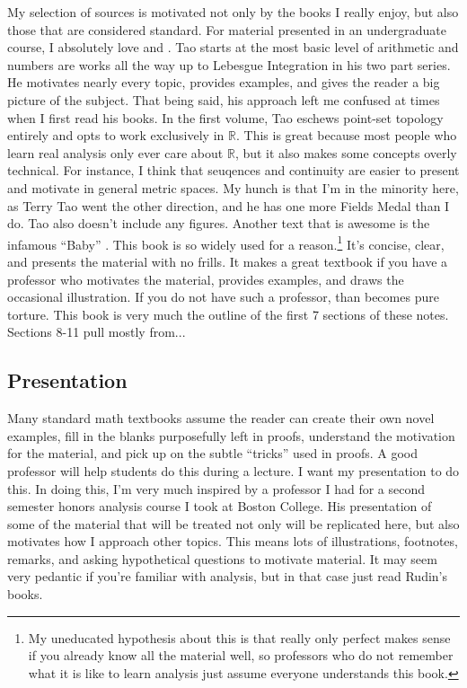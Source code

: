 \documentclass{article}
\newcommand{\R}{\mathbb{R}}
\theoremstyle{definition}
\begin{document}
	
	My selection of sources is motivated not only by the books I really enjoy, but also those that are considered standard. For material presented in an undergraduate course, I absolutely love \cite{tao2006analysis} and \cite{tao2009analysis}. Tao starts at the most basic level of arithmetic and numbers are works all the way up to Lebesgue Integration in his two part series. He motivates nearly every topic, provides examples, and gives the reader a big picture of the subject. That being said, his approach left me confused at times when I first read his books. In the first volume, Tao eschews point-set topology entirely and opts to work exclusively in $ \R $. This is great because most people who learn real analysis only ever care about $ \R $, but it also makes some concepts overly technical. For instance, I think that seuqences and continuity are easier to present and motivate in general metric spaces. My hunch is that I'm in the minority here, as Terry Tao went the other direction, and he has one more Fields Medal than I do. Tao also doesn't include any figures. Another text that is awesome is the infamous ``Baby'' \cite{rudin1964principles}. This book is so widely used for a reason.\footnote{My uneducated hypothesis about this is that \cite{rudin1964principles} really only perfect makes sense if you already know all the material well, so professors who do not remember what it is like to learn analysis just assume everyone understands this book.} It's concise, clear, and presents the material with no frills. It makes a great textbook if you have a professor who motivates the material, provides examples, and draws the occasional illustration. If you do not have such a professor, than \cite{rudin1964principles} becomes pure torture. This book is very much the outline of the first 7 sections of these notes. Sections 8-11 pull mostly from...
	
	
	\subsection{Presentation}
	Many standard math textbooks assume the reader can create their own novel examples, fill in the blanks purposefully left in proofs, understand the motivation for the material, and pick up on the subtle ``tricks'' used in proofs. A good professor will help students do this during a lecture. I want my presentation to do this. In doing this, I'm very much inspired by a professor I had for a second semester honors analysis course I took at Boston College. His presentation of some of the material that will be treated not only will be replicated here, but also motivates how I approach other topics. This means lots of illustrations, footnotes, remarks, and asking hypothetical questions to motivate material. It may seem very pedantic if you're familiar with analysis, but in that case just read Rudin's books. 
	\newpage
\end{document}
